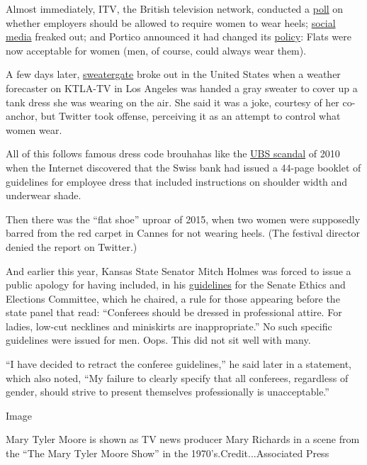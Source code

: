 Almost immediately, ITV, the British television network, conducted a
\href{https://twitter.com/itvnews/status/730622484815314945}{poll} on
whether employers should be allowed to require women to wear heels;
\href{https://www.facebookcorewwwi.onion/StylistMagazine/videos/10155275808519572/?pnref=story}{social
media} freaked out; and Portico announced it had changed its
\href{http://www.bbc.com/news/uk-england-london-36272893}{policy}: Flats
were now acceptable for women (men, of course, could always wear them).

A few days later,
\href{http://www.nytimes3xbfgragh.onion/2016/05/17/style/meteorologist-ktla-dress-cover-up.html}{sweatergate}
broke out in the United States when a weather forecaster on KTLA-TV in
Los Angeles was handed a gray sweater to cover up a tank dress she was
wearing on the air. She said it was a joke, courtesy of her co-anchor,
but Twitter took offense, perceiving it as an attempt to control what
women wear.

All of this follows famous dress code brouhahas like the
\href{http://www.bbc.com/news/business-12207296}{UBS scandal} of 2010
when the Internet discovered that the Swiss bank had issued a 44-page
booklet of guidelines for employee dress that included instructions on
shoulder width and underwear shade.

Then there was the ``flat shoe'' uproar of 2015, when two women were
supposedly barred from the red carpet in Cannes for not wearing heels.
(The festival director denied the report on Twitter.)

And earlier this year, Kansas State Senator Mitch Holmes was forced to
issue a public apology for having included, in his
\href{http://cjonline.com/news/2016-01-21/kansas-senate-chairmans-rules-block-female-witnesses-revealing-attire}{guidelines}
for the Senate Ethics and Elections Committee, which he chaired, a rule
for those appearing before the state panel that read: ``Conferees should
be dressed in professional attire. For ladies, low-cut necklines and
miniskirts are inappropriate.'' No such specific guidelines were issued
for men. Oops. This did not sit well with many.

``I have decided to retract the conferee guidelines,'' he said later in
a statement, which also noted, ``My failure to clearly specify that all
conferees, regardless of gender, should strive to present themselves
professionally is unacceptable.''

Image

Mary Tyler Moore is shown as TV news producer Mary Richards in a scene
from the ``The Mary Tyler Moore Show'' in the 1970's.Credit...Associated
Press

